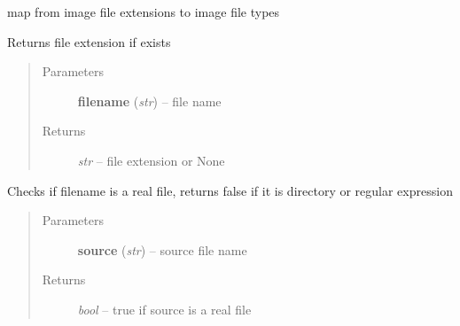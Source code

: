 \documentclass[letterpaper,10pt,english]{sphinxmanual}
\begin{document}

\begin{fulllineitems}
\label{api/ClearMap.IO:ClearMap.IO.IO.dataFileExtensionToType}
map from image file extensions to image file types

\end{fulllineitems}


\begin{fulllineitems}
\label{api/ClearMap.IO:ClearMap.IO.IO.fileExtension}
Returns file extension if exists
\begin{quote}\begin{description}
\item[{Parameters}] \leavevmode
\textbf{filename} (\emph{str}) --
file name

\item[{Returns}] \leavevmode
\emph{str} --
file extension or None

\end{description}\end{quote}

\end{fulllineitems}


\begin{fulllineitems}
\label{api/ClearMap.IO:ClearMap.IO.IO.isFile}
Checks if filename is a real file, returns false if it is directory or regular expression
\begin{quote}\begin{description}
\item[{Parameters}] \leavevmode
\textbf{source} (\emph{str}) --
source file name

\item[{Returns}] \leavevmode
\emph{bool} --
true if source is a real file

\end{description}\end{quote}

\end{fulllineitems}
\end{document}
